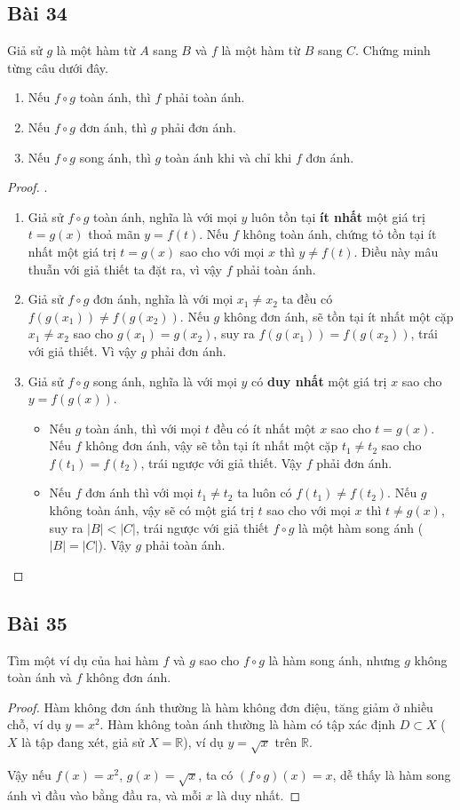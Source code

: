 \subsection*{Bài 34}
Giả sử $g$ là một hàm từ $A$ sang $B$ và $f$ là một hàm từ $B$ sang $C$. Chứng minh từng câu dưới đây.
\begin{enumerate}[label=\alph*)]
    \item Nếu $f\circ g$ toàn ánh, thì $f$ phải toàn ánh.
    \item Nếu $f\circ g$ đơn ánh, thì $g$ phải đơn ánh.
    \item Nếu $f\circ g$ song ánh, thì $g$ toàn ánh khi và chỉ khi $f$ đơn ánh.
\end{enumerate}
\begin{proof}.
    \begin{enumerate}[label=\alph*)]
        \item Giả sử $f\circ g$ toàn ánh, nghĩa là với mọi $y$ luôn tồn tại \textbf{ít nhất} một giá trị $t=g(x)$ thoả mãn $y=f(t)$. Nếu $f$ không toàn ánh, chứng tỏ tồn tại ít nhất một giá trị $t=g(x)$ sao cho với mọi $x$ thì $y\neq f(t)$. Điều này mâu thuẫn với giả thiết ta đặt ra, vì vậy $f$ phải toàn ánh.
        \item Giả sử $f\circ g$ đơn ánh, nghĩa là với mọi $x_1\neq x_2$ ta đều có $f(g(x_1))\neq f(g(x_2))$. Nếu $g$ không đơn ánh, sẽ tồn tại ít nhất một cặp $x_1\neq x_2$ sao cho $g(x_1)=g(x_2)$, suy ra $f(g(x_1))=f(g(x_2))$, trái với giả thiết. Vì vậy $g$ phải đơn ánh.
        \item Giả sử $f\circ g$ song ánh, nghĩa là với mọi $y$ có \textbf{duy nhất} một giá trị $x$ sao cho $y=f(g(x))$. \begin{itemize}
            \item Nếu $g$ toàn ánh, thì với mọi $t$ đều có ít nhất một $x$ sao cho $t=g(x)$. Nếu $f$ không đơn ánh, vậy sẽ tồn tại ít nhất một cặp $t_1\neq t_2$ sao cho $f(t_1)=f(t_2)$, trái ngược với giả thiết. Vậy $f$ phải đơn ánh.
            \item Nếu $f$ đơn ánh thì với mọi $t_1\neq t_2$ ta luôn có $f(t_1)\neq f(t_2)$. Nếu $g$ không toàn ánh, vậy sẽ có một giá trị $t$ sao cho với mọi $x$ thì $t\neq g(x)$, suy ra $|B|<|C|$, trái ngược với giả thiết $f\circ g$ là một hàm song ánh ($|B|=|C|$). Vậy $g$ phải toàn ánh.
        \end{itemize}
    \end{enumerate}
\end{proof}
\subsection*{Bài 35}
Tìm một ví dụ của hai hàm $f$ và $g$ sao cho $f\circ g$ là hàm song ánh, nhưng $g$ không toàn ánh và $f$ không đơn ánh.
\begin{proof}
    Hàm không đơn ánh thường là hàm không đơn điệu, tăng giảm ở nhiều chỗ, ví dụ $y=x^2$. Hàm không toàn ánh thường là hàm có tập xác định $D\subset X$ ($X$ là tập đang xét, giả sử $X=\mathbb{R}$), ví dụ $y=\sqrt x$ trên $\mathbb{R}$.

    Vậy nếu $f(x)=x^2$, $g(x)=\sqrt{x}$, ta có $(f\circ g)(x)=x$, dễ thấy là hàm song ánh vì đầu vào bằng đầu ra, và mỗi $x$ là duy nhất.
\end{proof}
